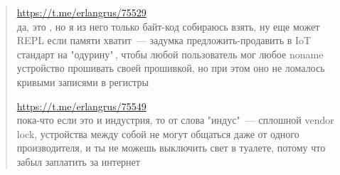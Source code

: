 \clearpage
{}\secdown

\clearpage
\begin{quotation}
\url{https://t.me/erlangrus/75529}\\
да, это \F, но я из него только байт-код собираюсь взять, ну еще может REPL если
памяти хватит\ --- задумка предложить-продавить в IoT стандарт на "одурину"\,,
чтобы любой пользователь мог любое noname устройство прошивать своей прошивкой,
но при этом оно не ломалось кривыми записями в регистры

\url{https://t.me/erlangrus/75549}\\
пока-что если это и индустрия, то от слова "индус"\ --- сплошной vendor lock,
устройства между собой не могут общаться даже от одного производителя, и ты не
можешь выключить свет в туалете, потому что забыл заплатить за интернет

\end{quotation}

\secup
